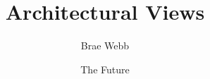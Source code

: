 \documentclass{csse4400}
\title{Architectural Views}
\author{Brae Webb}
\date{{\color{red} The Future}}
\begin{document}
\makecover





\end{document}
